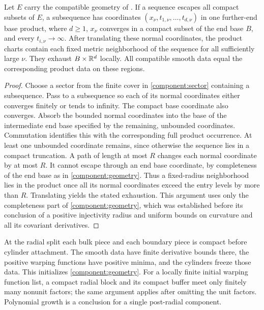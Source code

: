 \begin{lemma}\label{component:escape}
Let $E$ carry the compatible geometry of .
If a sequence escapes all compact subsets of $E$, a
subsequence has coordinates $(x_\nu,t_{1,\nu},\ldots,t_{d,\nu})$
in one further-end base product, where $d\ge1$, $x_\nu$ converges in a
compact subset of the end base $B$, and every $t_{i,\nu}\to\infty$.
After translating these normal coordinates, the product charts contain
each fixed metric neighborhood of the sequence for all sufficiently
large $\nu$.  They exhaust $B\times\mathbb R^d$ locally.  All compatible
smooth data equal the corresponding product data on these regions.
\end{lemma}

\begin{proof}
Choose a sector from the finite cover in
\cref{component:sector} containing a subsequence.  Pass to a subsequence
so each of its normal coordinates either converges finitely or tends
to infinity.  The compact base coordinate also converges.  Absorb the
bounded normal coordinates into the base of the intermediate end base
specified by the remaining, unbounded coordinates.  Commutation
identifies this with the corresponding full product occurrence.
At least one unbounded coordinate remains, since otherwise the
sequence lies in a compact truncation.  A path of length at most $R$
changes each normal coordinate by at most $R$.  It cannot escape
through an end base coordinate, by completeness of the end base as in
\cref{component:geometry}.  Thus a fixed-radius neighborhood lies in the
product once all its normal coordinates exceed the entry levels by
more than $R$.  Translating yields the stated exhaustion.  This
argument uses only the completeness part of \cref{component:geometry},
which was established before its conclusion of a positive injectivity radius and uniform bounds on
curvature and all its covariant derivatives.
\end{proof}

At the radial split each bulk piece and each boundary piece is compact
before cylinder attachment.  The smooth data have finite derivative
bounds there, the positive warping functions have positive minima, and the
cylinders freeze those data.  This initializes \cref{component:geometry}.
For a locally finite initial warping function list, a compact radial block and its
compact buffer meet only finitely many nonunit factors; the same
argument applies after omitting the unit factors.  Polynomial growth
is a conclusion for a single post-radial component.

